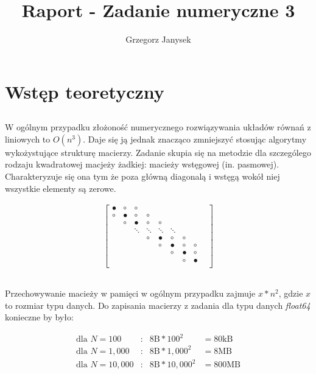 \documentclass[11pt]{extarticle}
\author{Grzegorz Janysek}
\title{Raport - Zadanie numeryczne 3}
\begin{document}
	\maketitle

	\section{Wstęp teoretyczny}
	
	\subsection{}

	W ogólnym przypadku złożoność numerycznego rozwiązywania układów równań z liniowych to \(O(n^3)\).
	Daje się ją jednak znacząco zmniejszyć stosując algorytmy wykożystujące strukturę macierzy.
	Zadanie skupia się na metodzie dla szczególego rodzaju kwadratowej macjeży żadkiej: macieży wstęgowej (in. pasmowej). 
	Charakteryzuje się ona tym że poza główną diagonalą i wstęgą wokół niej wszystkie elementy są zerowe.
	
	\begin{align}
		\begin{bmatrix}
								\bullet	&	\circ	&	\circ	\\
					\circ	&	\bullet	&	\circ	&	\circ	\\
			&		\circ	&	\bullet	&	\circ	&	\circ	\\
			&&		\ddots	&	\ddots	&	\ddots	&	\ddots	\\
			&&&		\circ	&	\bullet	&	\circ	&	\circ	\\
			&&&&	\circ	&	\bullet	&	\circ	&	\circ	\\
			&&&&&	\circ	&	\bullet &	\circ	\\
			&&&&&&	\circ	&	\bullet	&	\\
		\end{bmatrix}
	\end{align}
	
	\subsection{}

	Przechowywanie macieży w pamięci w ogólnym przypadku zajmuje \(x*n^2\), gdzie \(x\) to rozmiar typu danych.
	Do zapisania macierzy z zadania dla typu danych \emph{float64} konieczne by było: 

	\begin{align}
		\text{dla } N=100 &:& 8\text{B}*100^2 &= 80\text{kB} \\
		\text{dla } N=1,000 &:& 8\text{B}*1,000^2 &= 8\text{MB} \\
		\text{dla } N=10,000 &:& 8\text{B}*10,000^2 &= 800\text{MB}
	\end{align}
\end{document}
